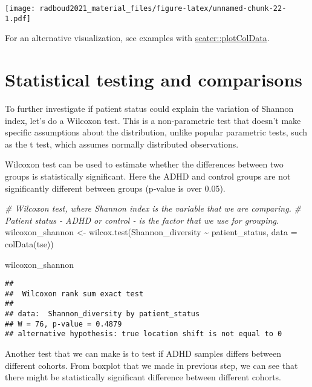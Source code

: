 \documentclass[
]{book}
\newenvironment{Shaded}{\begin{snugshade}}{\end{snugshade}}
\newcommand{\AttributeTok}[1]{\textcolor[rgb]{0.77,0.63,0.00}{#1}}
\newcommand{\CommentTok}[1]{\textcolor[rgb]{0.56,0.35,0.01}{\textit{#1}}}
\newcommand{\FunctionTok}[1]{\textcolor[rgb]{0.00,0.00,0.00}{#1}}
\newcommand{\NormalTok}[1]{#1}
\newcommand{\OtherTok}[1]{\textcolor[rgb]{0.56,0.35,0.01}{#1}}
\newcommand{\SpecialCharTok}[1]{\textcolor[rgb]{0.00,0.00,0.00}{#1}}
\begin{document}
\texttt{[image: radboud2021\_material\_files/figure-latex/unnamed-chunk-22-1.pdf]}

For an alternative visualization, see examples with \href{https://microbiome.github.io/OMA/microbiome-diversity.html\#alpha-diversity}{scater::plotColData}.

\hypertarget{statistical-testing-and-comparisons}{%
\section{Statistical testing and comparisons}\label{statistical-testing-and-comparisons}}

To further investigate if patient status could explain the variation
of Shannon index, let's do a Wilcoxon test. This is a non-parametric
test that doesn't make specific assumptions about the distribution,
unlike popular parametric tests, such as the t test, which assumes
normally distributed observations.

Wilcoxon test can be used to estimate whether the differences between
two groups is statistically significant. Here the ADHD and control
groups are not significantly different between groups (p-value is over
0.05).

\begin{Shaded}
\begin{Highlighting}[]
\CommentTok{\# Wilcoxon test, where Shannon index is the variable that we are comparing. }
\CommentTok{\# Patient status {-} ADHD or control {-} is the factor that we use for grouping. }
\NormalTok{wilcoxon\_shannon }\OtherTok{\textless{}{-}} \FunctionTok{wilcox.test}\NormalTok{(Shannon\_diversity }\SpecialCharTok{\textasciitilde{}}\NormalTok{ patient\_status, }\AttributeTok{data =} \FunctionTok{colData}\NormalTok{(tse))}

\NormalTok{wilcoxon\_shannon}
\end{Highlighting}
\end{Shaded}

\begin{verbatim}
## 
##  Wilcoxon rank sum exact test
## 
## data:  Shannon_diversity by patient_status
## W = 76, p-value = 0.4879
## alternative hypothesis: true location shift is not equal to 0
\end{verbatim}

Another test that we can make is to test if ADHD samples differs between different
cohorts. From boxplot that we made in previous step, we can see that there might
be statistically significant difference between different cohorts.
\end{document}
